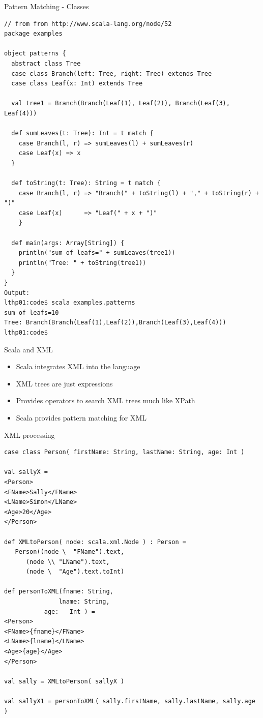 \documentclass[t]{beamer}
\begin{document}
\begin{frame}[fragile]{Pattern Matching - Classes}
  \begin{tiny}
  \begin{verbatim}
// from from http://www.scala-lang.org/node/52
package examples

object patterns {
  abstract class Tree
  case class Branch(left: Tree, right: Tree) extends Tree
  case class Leaf(x: Int) extends Tree

  val tree1 = Branch(Branch(Leaf(1), Leaf(2)), Branch(Leaf(3), Leaf(4)))

  def sumLeaves(t: Tree): Int = t match {
    case Branch(l, r) => sumLeaves(l) + sumLeaves(r)
    case Leaf(x) => x
  }

  def toString(t: Tree): String = t match {
    case Branch(l, r) => "Branch(" + toString(l) + "," + toString(r) + ")"
    case Leaf(x)      => "Leaf(" + x + ")"
    }

  def main(args: Array[String]) {
    println("sum of leafs=" + sumLeaves(tree1))
    println("Tree: " + toString(tree1))
  }
}
Output:
lthp01:code$ scala examples.patterns
sum of leafs=10
Tree: Branch(Branch(Leaf(1),Leaf(2)),Branch(Leaf(3),Leaf(4)))
lthp01:code$ 
  \end{verbatim}
  \end{tiny}
  \note{}
\end{frame}


\begin{frame}{Scala and XML}
  \begin{itemize}
  \item Scala integrates XML into the language
  \item XML trees are just expressions
  \item Provides operators to search XML trees much like XPath
  \item Scala provides pattern matching for XML
  \end{itemize}
  \note{}
\end{frame}


\begin{frame}[fragile]{XML processing}
  \begin{tiny}
  \begin{verbatim}
case class Person( firstName: String, lastName: String, age: Int )

val sallyX = 
<Person>
<FName>Sally</FName>
<LName>Simon</LName>
<Age>20</Age>
</Person>

def XMLtoPerson( node: scala.xml.Node ) : Person =
   Person((node \  "FName").text,
	  (node \\ "LName").text,
	  (node \  "Age").text.toInt)

def personToXML(fname: String,
               lname: String,
	       age:   Int ) =
<Person>
<FName>{fname}</FName>
<LName>{lname}</LName>
<Age>{age}</Age>
</Person>

val sally = XMLtoPerson( sallyX )

val sallyX1 = personToXML( sally.firstName, sally.lastName, sally.age )
  \end{verbatim}
  \end{tiny}
  \note{}
\end{frame}
\end{document}
